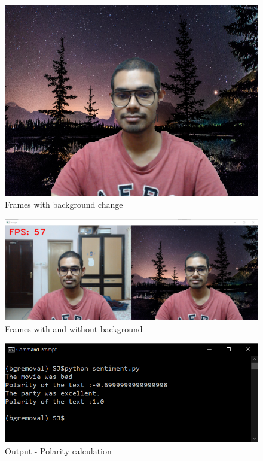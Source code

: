 \begin{figure}[H]
\centering
\includegraphics[width = .8\textwidth]{Images/DesProOutput2}
\caption{Frames with background change}
\label{List of organizations}
\end{figure}

\begin{figure}[H]
\centering
\includegraphics[width = .8\textwidth]{Images/DesProOutput}
\caption{Frames with and without background}
\label{List of organizations}
\end{figure}

\begin{figure}[H]
\centering
\includegraphics[width = .8\textwidth]{Images/Polarity}
\caption{Output - Polarity calculation}
\label{List of organizations}
\end{figure}

